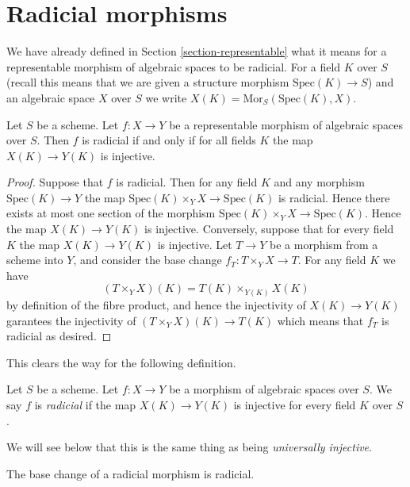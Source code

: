 \section{Radicial morphisms}
\label{section-radicial}

\noindent
We have already defined in Section \ref{section-representable}
what it means for a representable morphism of algebraic spaces
to be radicial. For a field $K$ over $S$ (recall this means that
we are given a structure morphism $\text{Spec}(K) \to S$) and an
algebraic space $X$ over $S$ we write
$X(K) = \text{Mor}_S(\text{Spec}(K), X)$.

\begin{lemma}
\label{lemma-radical-representable}
Let $S$ be a scheme. Let $f : X \to Y$ be a representable
morphism of algebraic spaces over $S$. Then
$f$ is radicial if and only if for all fields $K$ the
map $X(K) \to Y(K)$ is injective.
\end{lemma}

\begin{proof}
Suppose that $f$ is radicial. Then for any field $K$ and any morphism
$\text{Spec}(K) \to Y$ the map $\text{Spec}(K) \times_Y X \to \text{Spec}(K)$
is radicial. Hence there exists at most one section of the morphism
$\text{Spec}(K) \times_Y X \to \text{Spec}(K)$. Hence the map
$X(K) \to Y(K)$ is injective. Conversely, suppose that for every field $K$
the map $X(K) \to Y(K)$ is injective. Let $T \to Y$ be a morphism from a
scheme into $Y$, and consider the base change $f_T : T \times_Y X \to T$.
For any field $K$ we have
$$
(T \times_Y X)(K) = T(K) \times_{Y(K)} X(K)
$$
by definition of the fibre product, and hence the injectivity of
$X(K) \to Y(K)$ garantees the injectivity of
$(T \times_Y X)(K) \to T(K)$ which means that $f_T$ is radicial as desired.
\end{proof}

\noindent
This clears the way for the following definition.

\begin{definition}
\label{definition-radicial}
Let $S$ be a scheme. Let $f : X \to Y$ be a morphism of algebraic
spaces over $S$. We say $f$ is {\it radicial}
if the map $X(K) \to Y(K)$ is injective for every field $K$ over $S$.
\end{definition}

\noindent
We will see below that this is the same thing as being {\it universally
injective}.

\begin{lemma}
\label{lemma-base-change-radicial}
The base change of a radicial morphism is radicial.
\end{lemma}

